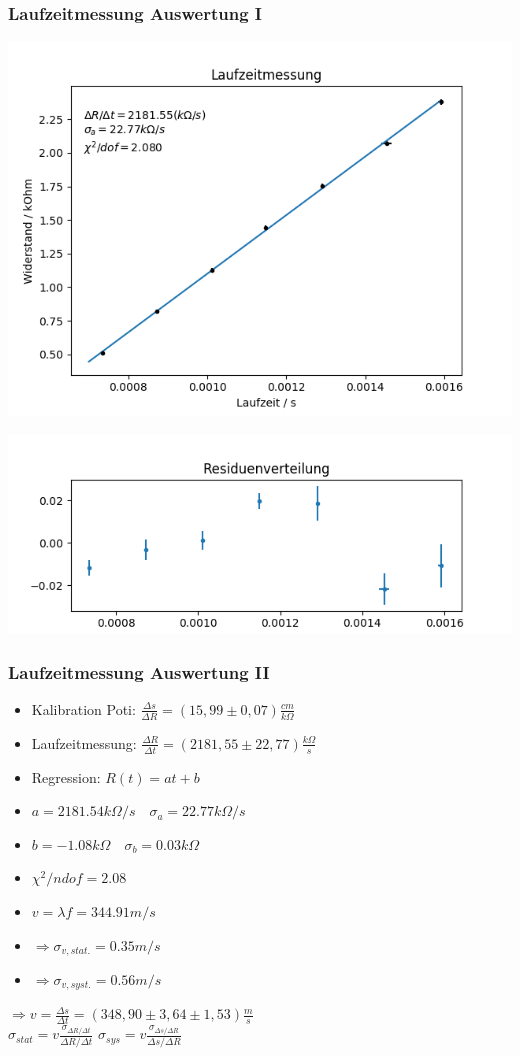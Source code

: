 \documentclass[12pt]{beamer}
\begin{document}
	\begin{frame}
		\frametitle{Laufzeitmessung \qquad Auswertung I}
		\begin{center}
			\includegraphics[width=0.6\linewidth]{fit_laufzeit}
			
			\includegraphics[width=0.6\linewidth]{residuen_laufzeit}
		\end{center}
		
	\end{frame}

	\begin{frame}
		\frametitle{Laufzeitmessung \qquad Auswertung II}
		\begin{itemize}
			\item Kalibration Poti: $\frac{\Delta s}{\Delta R} = (15,99 \pm 0,07) \frac{cm}{k\Omega}$\\ [0.3cm]
			\item Laufzeitmessung: $\frac{\Delta R}{\Delta t} = (2181,55 \pm 22,77) \frac{k\Omega}{s}$
			
			
			\item Regression: $R(t)=a t+b$
			\item $a=2181.54 k\Omega/s \quad \sigma_a=22.77 k\Omega/s$
			\item $b=-1.08 k\Omega \quad \sigma_b=0.03 k\Omega$
			\item $\chi^2/ndof=2.08$
			\item $v=\lambda f = 344.91m/s$
			\item $\Rightarrow \sigma_{v,stat.}=0.35m/s$
			\item $\Rightarrow \sigma_{v,syst.}=0.56m/s$
			
		\end{itemize}
		
		$\Rightarrow v = \frac{\Delta s}{\Delta t} = (348,90 \pm 3,64 \pm 1,53) \frac{m}{s}$ \\ [0.3cm]
		\qquad $\sigma _{stat} = v \frac{\sigma _{\Delta R/\Delta t}}{\Delta R / \Delta t}$ \qquad $\sigma _{sys} = v \frac{\sigma _{\Delta s/\Delta R}}{\Delta s / \Delta R}$
	\end{frame}
	
\end{document}
